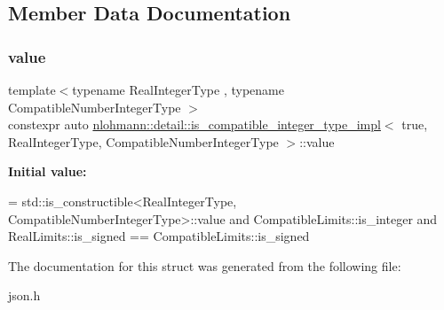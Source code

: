 \subsection{Member Data Documentation}
\mbox{\label{structnlohmann_1_1detail_1_1is__compatible__integer__type__impl_3_01true_00_01RealIntegerType_0064332c4ada80cab3523aebd66ccc012a_a4c27142452b43418b1d5c0aad01bff50}} 
\subsubsection{\texorpdfstring{value}{value}}
{\footnotesize\ttfamily template$<$typename Real\+Integer\+Type , typename Compatible\+Number\+Integer\+Type $>$ \\
constexpr auto \hyperlink{structnlohmann_1_1detail_1_1is__compatible__integer__type__impl}{nlohmann\+::detail\+::is\+\_\+compatible\+\_\+integer\+\_\+type\+\_\+impl}$<$ true, Real\+Integer\+Type, Compatible\+Number\+Integer\+Type $>$\+::value\hspace{0.3cm}{\ttfamily [static]}}

{\bfseries Initial value\+:}
\begin{DoxyCode}
=
        std::is\_constructible<RealIntegerType,
        CompatibleNumberIntegerType>::value and
        CompatibleLimits::is\_integer and
        RealLimits::is\_signed == CompatibleLimits::is\_signed
\end{DoxyCode}


The documentation for this struct was generated from the following file\+:\begin{DoxyCompactItemize}
\item 
json.\+h\end{DoxyCompactItemize}
